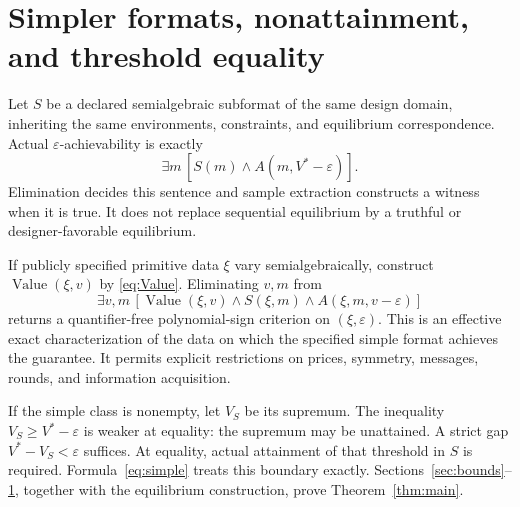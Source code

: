 \documentclass[11pt,a4paper]{article}
\numberwithin{equation}{section}
\theoremstyle{definition}
\DeclareMathOperator{\Val}{Value}
\begin{document}
\section{Simpler formats, nonattainment, and threshold equality}\label{sec:simple}
Let \(S\) be a declared semialgebraic subformat of the same design
domain, inheriting the same environments, constraints, and equilibrium
correspondence. Actual \(\varepsilon\)-achievability is exactly
\begin{equation}\label{eq:simple}
 \exists m\,[S(m)\wedge A(m,V^*-\varepsilon)].
\end{equation}
Elimination decides this sentence and sample extraction constructs
a witness when it is true.
It does not replace sequential equilibrium by a truthful or
designer-favorable equilibrium.

If publicly specified primitive data \(\xi\) vary semialgebraically,
construct \(\Val(\xi,v)\) by \eqref{eq:Value}.
Eliminating \(v,m\) from
\[
 \exists v,m\,[\Val(\xi,v)\wedge S(\xi,m)
                    \wedge A(\xi,m,v-\varepsilon)]
\]
returns a quantifier-free polynomial-sign criterion on
\((\xi,\varepsilon)\).
This is an effective exact characterization of the data on which
the specified simple format achieves the guarantee.
It permits explicit restrictions on prices, symmetry, messages,
rounds, and information acquisition.

If the simple class is nonempty, let \(V_S\) be its supremum.
The inequality \(V_S\ge V^*-\varepsilon\) is weaker at equality:
the supremum may be unattained.
A strict gap \(V^*-V_S<\varepsilon\) suffices.
At equality, actual attainment of that threshold in \(S\) is required.
Formula~\eqref{eq:simple} treats this boundary exactly.
Sections~\ref{sec:bounds}--\ref{sec:simple}, together with the
equilibrium construction, prove Theorem~\ref{thm:main}.
\end{document}
